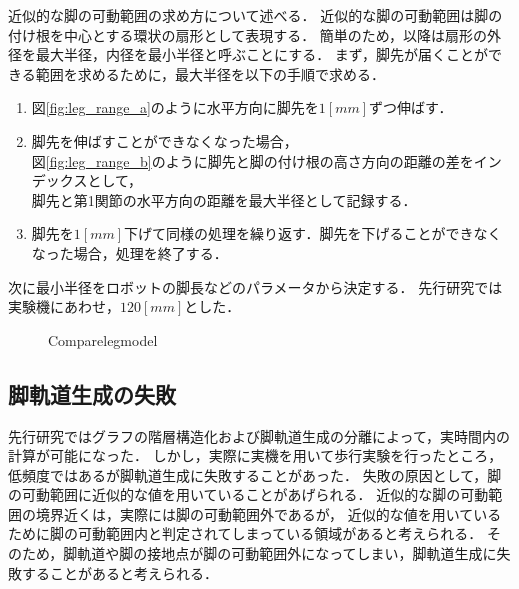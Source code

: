 近似的な脚の可動範囲の求め方について述べる．
近似的な脚の可動範囲は脚の付け根を中心とする環状の扇形として表現する．
簡単のため，以降は扇形の外径を最大半径，内径を最小半径と呼ぶことにする．
まず，脚先が届くことができる範囲を求めるために，最大半径を以下の手順で求める．
\begin{enumerate}
  \item 図\ref{fig:leg_range_a}のように水平方向に脚先を$1 [mm]$ずつ伸ばす．
  \item 脚先を伸ばすことができなくなった場合，\\
        図\ref{fig:leg_range_b}のように脚先と脚の付け根の高さ方向の距離の差をインデックスとして，\\
        脚先と第1関節の水平方向の距離を最大半径として記録する．
  \item 脚先を$1 [mm]$下げて同様の処理を繰り返す．脚先を下げることができなくなった場合，処理を終了する．
\end{enumerate}
次に最小半径をロボットの脚長などのパラメータから決定する．
先行研究では実験機にあわせ，$120 [mm]$とした．

\begin{figure}[h]
  \hspace{0.04\columnwidth}
  \caption{Comparelegmodel}
  \label{fig:leg_range}
\end{figure}

\subsection{脚軌道生成の失敗}
先行研究ではグラフの階層構造化および脚軌道生成の分離によって，実時間内の計算が可能になった．
しかし，実際に実機を用いて歩行実験を行ったところ，低頻度ではあるが脚軌道生成に失敗することがあった．
失敗の原因として，脚の可動範囲に近似的な値を用いていることがあげられる．
近似的な脚の可動範囲の境界近くは，実際には脚の可動範囲外であるが，
近似的な値を用いているために脚の可動範囲内と判定されてしまっている領域があると考えられる．
そのため，脚軌道や脚の接地点が脚の可動範囲外になってしまい，脚軌道生成に失敗することがあると考えられる．

